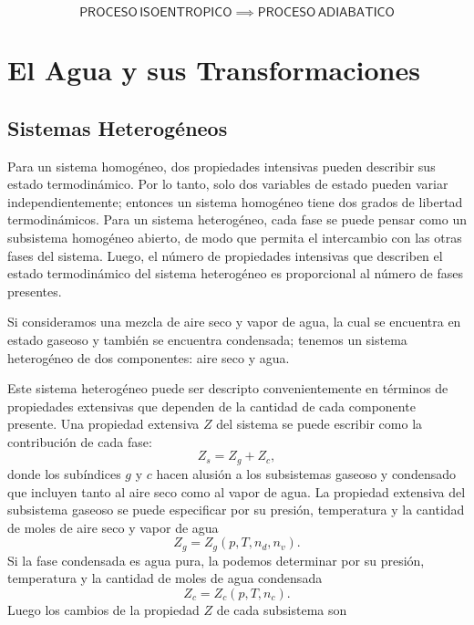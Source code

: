\documentclass[openany]{book}
\begin{document}
\begin{equation*}
	\mathsf{PROCESO\, ISOENTROPICO}\implies\mathsf{PROCESO\, ADIABATICO}
\end{equation*}

\chapter{El Agua y sus Transformaciones}
\section{Sistemas Heterogéneos}
Para un sistema homogéneo, dos propiedades intensivas pueden describir sus estado termodinámico. Por lo tanto, solo dos variables de estado pueden variar independientemente; entonces un sistema homogéneo tiene dos grados de libertad termodinámicos. Para un sistema heterogéneo, cada fase se puede pensar como un subsistema homogéneo abierto, de modo que permita el intercambio con las otras fases del sistema. Luego, el número de propiedades intensivas que describen el estado termodinámico del sistema heterogéneo es proporcional al número de fases presentes.
\par Si consideramos una mezcla de aire seco y vapor de agua, la cual se encuentra en estado gaseoso y también se encuentra condensada; tenemos un sistema heterogéneo de dos componentes: aire seco y agua.
\par Este sistema heterogéneo puede ser descripto convenientemente en términos de propiedades extensivas que dependen de la cantidad de cada componente presente. Una propiedad extensiva $Z$ del sistema se puede escribir como la contribución de cada fase:
\begin{equation}\label{eq:Zs}
	Z_{s}=Z_{g}+Z_{c},
\end{equation}
donde los subíndices $g$ y $c$ hacen alusión a los subsistemas gaseoso y condensado que incluyen tanto al aire seco como al vapor de agua. La propiedad extensiva del subsistema gaseoso se puede especificar por su presión, temperatura y la cantidad de moles de aire seco y vapor de agua
\begin{equation*}
	Z_{g}=Z_{g}(p,T,n_{d},n_{v}).
\end{equation*}
Si la fase condensada es agua pura, la podemos determinar por su presión, temperatura y la cantidad de moles de agua condensada
\begin{equation*}
	Z_{c}=Z_{c}(p,T,n_{c}).
\end{equation*}
Luego los cambios de la propiedad $Z$ de cada subsistema son
\end{document}
